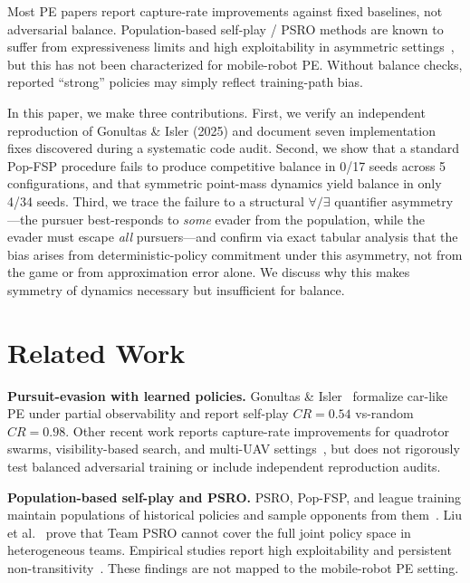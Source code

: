 \documentclass[letterpaper, 10pt, journal]{IEEEtran}
\begin{document}
Most PE papers report capture-rate improvements against fixed baselines, not adversarial balance. Population-based self-play / PSRO methods are known to suffer from expressiveness limits and high exploitability in asymmetric settings~\cite{lanctot2017psro,lockhart2019exploitability,liu2024exante}, but this has not been characterized for mobile-robot PE. Without balance checks, reported ``strong'' policies may simply reflect training-path bias.

In this paper, we make three contributions. First, we verify an independent reproduction of Gonultas \& Isler (2025) and document seven implementation fixes discovered during a systematic code audit. Second, we show that a standard Pop-FSP procedure fails to produce competitive balance in 0/17 seeds across 5 configurations, and that symmetric point-mass dynamics yield balance in only 4/34 seeds. Third, we trace the failure to a structural $\forall/\exists$ quantifier asymmetry---the pursuer best-responds to \emph{some} evader from the population, while the evader must escape \emph{all} pursuers---and confirm via exact tabular analysis that the bias arises from deterministic-policy commitment under this asymmetry, not from the game or from approximation error alone. We discuss why this makes symmetry of dynamics necessary but insufficient for balance.

\section{Related Work}
\label{sec:related_work}

\textbf{Pursuit-evasion with learned policies.} Gonultas \& Isler~\cite{gonultas2024carlike} formalize car-like PE under partial observability and report self-play $CR = 0.54$ vs-random $CR = 0.98$. Other recent work reports capture-rate improvements for quadrotor swarms, visibility-based search, and multi-UAV settings~\cite{xiao2024amsdrl,bajcsy2024vision}, but does not rigorously test balanced adversarial training or include independent reproduction audits.

\textbf{Population-based self-play and PSRO.} PSRO, Pop-FSP, and league training maintain populations of historical policies and sample opponents from them~\cite{lanctot2017psro,heinrich2016nfsp,vinyals2019alphastar,mcaleer2022selfplay}. Liu et al.~\cite{liu2024exante} prove that Team PSRO cannot cover the full joint policy space in heterogeneous teams. Empirical studies report high exploitability and persistent non-transitivity~\cite{lockhart2019exploitability,selfplay2024survey}. These findings are not mapped to the mobile-robot PE setting.
\end{document}
